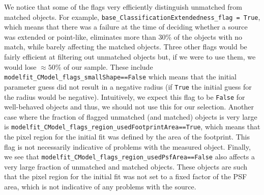 \documentclass[a4paper,fleqn,usenatbib]{mnras}
\begin{document}
We notice that some of the flags very efficiently distinguish unmatched from matched objects. For example, \texttt{base\_ClassificationExtendedness\_flag = True}, which means that there was a failure at the time of deciding whether a source was extended or point-like, eliminates more than 30\% of the objects with no match, while barely affecting the matched objects. Three other flags would be fairly efficient at filtering out unmatched objects but, if we were to use them, we would lose $\approx 50\%$ of our sample. These include \texttt{modelfit\_CModel\_flags\_smallShape==False} which means that the initial parameter guess did not result in a negative radius (if \texttt{True} the initial guess for the radius would be negative). Intuitively, we expect this flag to be \texttt{False} for well-behaved objects and thus, we should not use this for our selection. Another case where the fraction of flagged unmatched (and matched) objects is very large is \texttt{modelfit\_CModel\_flags\_region\_usedFootprintArea==True}, which means that the pixel region for the initial fit was defined by the area of the footprint. This flag is not necessarily indicative of problems with the measured object. Finally, we see that \texttt{modelfit\_CModel\_flags\_region\_usedPsfArea==False} also affects a very large fraction of unmatched and matched objects. These objects are such that the pixel region for the initial fit was not set to a fixed factor of the PSF area, which is not indicative of any problems with the source.
\end{document}
